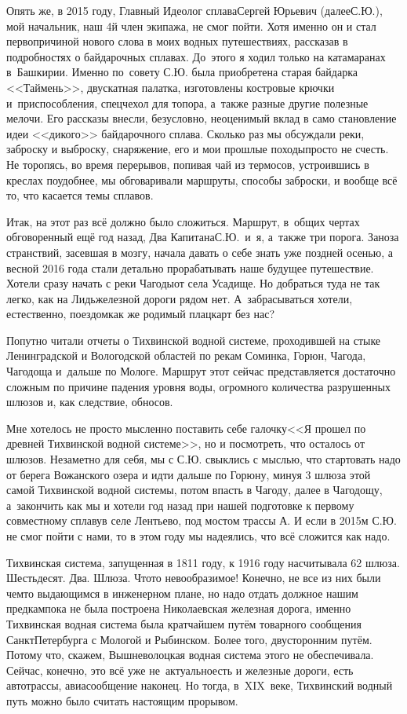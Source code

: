 Опять же, в 2015 году, Главный Идеолог сплава\mdash Сергей Юрьевич (далее\mdash С.Ю.), мой начальник, наш 4\sdash й член экипажа, не смог пойти. Хотя именно он и стал первопричиной нового слова в моих водных путешествиях, рассказав в подробностях о байдарочных сплавах. До~этого я ходил только на катамаранах в~Башкирии. Именно по~совету С.Ю. была приобретена старая байдарка <<Таймень>>, двускатная палатка, изготовлены костровые крючки и~приспособления, спецчехол для топора, а~также разные другие полезные мелочи. Его рассказы внесли, безусловно, неоценимый вклад в само становление идеи <<дикого>> байдарочного сплава. Сколько раз мы обсуждали реки, заброску и выброску, снаряжение, его и мои прошлые походы\mdash просто не счесть. Не торопясь, во время перерывов, попивая чай из термосов, устроившись в креслах поудобнее, мы обговаривали маршруты, способы заброски, и вообще всё то, что касается темы сплавов.

Итак, на этот раз всё должно было сложиться. Маршрут, в~общих чертах обговоренный ещё год назад, Два Капитана\mdash С.Ю.~и~я, а~также три порога. Заноза странствий, засевшая в мозгу, начала давать о себе знать уже поздней осенью, а весной 2016 года стали детально прорабатывать наше будущее путешествие. Хотели сразу начать с реки Чагоды\mdash от села Усадище. Но добраться туда не так легко, как на Лидь\mdash железной дороги рядом нет. А~забрасываться хотели, естественно, поездом\mdash как же родимый плацкарт без нас? 

Попутно читали отчеты о Тихвинской водной системе, проходившей на стыке Ленинградской и Вологодской областей по рекам Соминка, Горюн, Чагода, Чагодоща и~дальше по Мологе. Маршрут этот сейчас представляется достаточно сложным по причине падения уровня воды, огромного количества разрушенных шлюзов и, как следствие, обносов. 

Мне хотелось не просто мысленно поставить себе галочку\mdash <<Я прошел по древней Тихвинской водной системе>>, но и посмотреть, что осталось от шлюзов. Незаметно для себя, мы с С.Ю. свыклись с мыслью, что стартовать надо от берега Вожанского озера и идти дальше по Горюну, минуя 3 шлюза этой самой Тихвинской водной системы, потом впасть в Чагоду, далее в Чагодощу, а~закончить как мы и хотели год назад при нашей подготовке к первому совместному сплаву\mdash в селе Лентьево, под мостом трассы А. И если в 2015\sdash м С.Ю. не смог пойти с нами, то в этом году мы надеялись, что всё сложится как надо.

\newpage
Тихвинская система, запущенная в 1811 году, к 1916 году насчитывала 62 шлюза. Шестьдесят. Два. Шлюза. Что\sdash то невообразимое! Конечно, не все из них были чем\sdash то выдающимся в инженерном плане, но надо отдать должное нашим предкам\mdash пока не была построена Николаевская железная дорога, именно Тихвинская водная система была кратчайшем путём товарного сообщения Санкт\sdash Петербурга с Мологой и Рыбинском. Более того, двусторонним путём. Потому что, скажем, Вышневолоцкая водная система этого не обеспечивала. Сейчас, конечно, это всё уже не~актуально\mdash есть и железные дороги, есть автотрассы, авиасообщение наконец. Но тогда, в~XIX~веке, Тихвинский водный путь можно было считать настоящим прорывом. 

